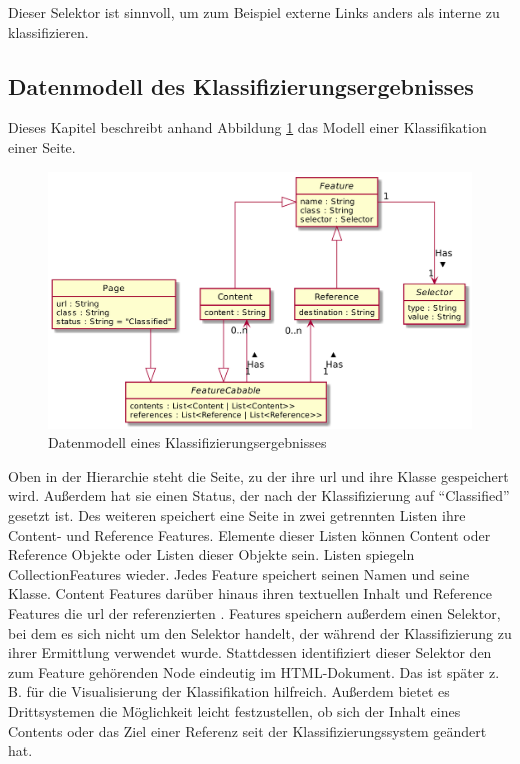         Dieser Selektor ist sinnvoll, um zum Beispiel externe Links anders als interne zu klassifizieren.

    \subsection{Datenmodell des Klassifizierungsergebnisses}
        \label{section:conceptPageDataModel}
        Dieses Kapitel beschreibt anhand Abbildung \ref{image:conceptPageDataModel}
        das Modell einer Klassifikation einer Seite.

        \begin{figure}[htb]
            \centering
            \includegraphics[width=\textwidth]{../resources/concept/page.png}
            \caption{Datenmodell eines Klassifizierungsergebnisses}
            \label{image:conceptPageDataModel}
        \end{figure}

        Oben in der Hierarchie steht die Seite,
        zu der ihre \gls{url} und ihre Klasse gespeichert wird.
        Außerdem hat sie einen Status, der nach der Klassifizierung auf
        "`Classified"' gesetzt ist.
        Des weiteren speichert eine Seite in zwei getrennten Listen ihre
        Content- und Reference Features.
        Elemente dieser Listen können Content oder Reference Objekte oder Listen
        dieser Objekte sein. Listen spiegeln CollectionFeatures wieder.
        Jedes Feature speichert seinen Namen und seine Klasse.
        Content Features darüber hinaus ihren textuellen Inhalt %
        und Reference Features die \gls{url} der referenzierten {\resource}.
        Features speichern außerdem einen Selektor, bei dem es sich nicht um den Selektor
        handelt, der während der Klassifizierung zu ihrer Ermittlung verwendet wurde.
        Stattdessen identifiziert dieser Selektor den zum Feature gehörenden Node eindeutig im HTML-Dokument.
        Das ist später z. B. für die Visualisierung der Klassifikation hilfreich.
        Außerdem bietet es Drittsystemen die Möglichkeit leicht festzustellen,
        ob sich der Inhalt eines Contents oder das Ziel einer Referenz seit der Klassifizierungssystem
        geändert hat.
